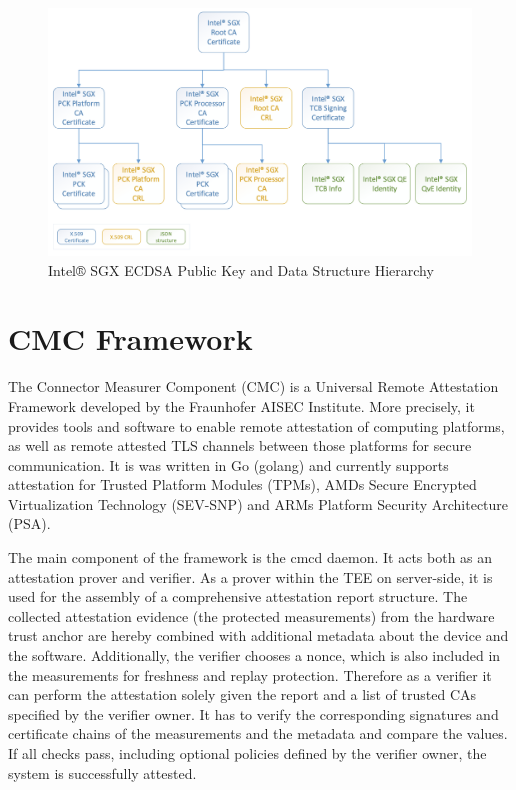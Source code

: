 \begin{figure}
	\begin{center} 
		\includegraphics[width=1.0\linewidth]{figures/sgx-cert-hierarchy.png}
	\end{center}
	\caption{Intel® SGX ECDSA Public Key and Data Structure Hierarchy \cite{pccs_design_guide}} 
	\label{sgx-cert-hierarchy}
\end{figure}

\section{CMC Framework}
The Connector Measurer Component (CMC) is a Universal Remote Attestation Framework developed by the Fraunhofer AISEC Institute. More precisely, it provides tools and software to enable remote attestation of computing platforms, as well as remote attested TLS channels between those platforms for secure communication. It is was written in Go (golang) and currently supports attestation for Trusted Platform Modules (TPMs), AMDs Secure Encrypted Virtualization Technology (SEV-SNP) and ARMs Platform Security Architecture (PSA). 

The main component of the framework is the cmcd daemon. It acts both as an attestation prover and verifier. As a prover within the TEE on server-side, it is used for the assembly of a comprehensive attestation report structure. The collected attestation evidence (the protected measurements) from the hardware trust anchor are hereby combined with additional metadata about the device and the software. Additionally, the verifier chooses a nonce, which is also included in the measurements for freshness and replay protection. 
Therefore as a verifier it can perform the attestation solely given the report and a list of trusted CAs specified by the verifier owner. It has to verify the corresponding signatures and certificate chains of the measurements and the metadata and compare the values. If all checks pass, including optional policies defined by the verifier owner, the system is successfully attested. 

